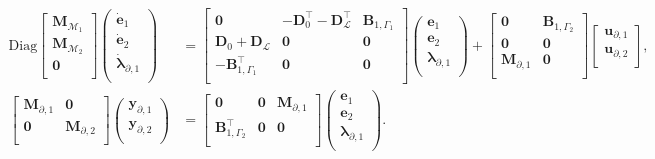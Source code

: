 \begin{equation}\label{eq:pHsys_infdim_mult1}
\begin{aligned}
\mathrm{Diag}
\begin{bmatrix}
\mathbf{M}_{\mathcal{M}_1}\\
\mathbf{M}_{\mathcal{M}_2}\\
\mathbf{0}\\
\end{bmatrix}
\begin{pmatrix}
\dot{\mathbf{e}}_{1} \\
\dot{\mathbf{e}}_{2} \\
\dot{\bm{\lambda}}_{\partial, 1} \\
\end{pmatrix}
&= \begin{bmatrix}
\mathbf{0} & -\mathbf{D}_{0}^\top - \mathbf{D}_{\mathcal{L}}^\top & \mathbf{B}_{1, \Gamma_1}\\
\mathbf{D}_{0} + \mathbf{D}_{\mathcal{L}} & \mathbf{0} & \mathbf{0} \\
-\mathbf{B}_{1, \Gamma_1}^\top & \mathbf{0} & \mathbf{0} \\
\end{bmatrix} 
\begin{pmatrix}
\mathbf{e}_{1} \\
\mathbf{e}_{2} \\
{\bm{\lambda}}_{\partial, 1} \\
\end{pmatrix} + 
\begin{bmatrix}
\mathbf{0} & \mathbf{B}_{1, \Gamma_2} \\
\mathbf{0} & \mathbf{0} \\
\mathbf{M}_{\partial, 1} & \mathbf{0} \\
\end{bmatrix}
\begin{bmatrix}
\mathbf{u}_{\partial, 1} \\
\mathbf{u}_{\partial, 2} \\
\end{bmatrix}, \\
\begin{bmatrix}
\mathbf{M}_{\partial, 1} & \mathbf{0} \\
\mathbf{0} & \mathbf{M}_{\partial, 2} \\
\end{bmatrix}
\begin{pmatrix}
\mathbf{y}_{\partial, 1} \\
\mathbf{y}_{\partial, 2} \\
\end{pmatrix}
&= \begin{bmatrix}
\mathbf{0} & \mathbf{0} & \mathbf{M}_{\partial, 1} \\
\mathbf{B}_{1, \Gamma_2}^\top & \mathbf{0} & \mathbf{0} \\
\end{bmatrix}\begin{pmatrix}
\mathbf{e}_{1} \\
\mathbf{e}_{2} \\
{\bm{\lambda}}_{\partial, 1} \\
\end{pmatrix}.
\end{aligned}
\end{equation}
